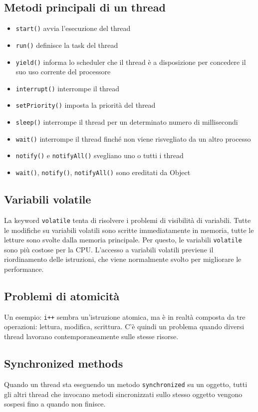 \documentclass[11pt]{article}
\newcommand{\code}[1]{\texttt{#1}}
\begin{document}
\subsection{Metodi principali di un thread}
\begin{itemize}
    \item \code{start()} avvia l'esecuzione del thread
    \item \code{run()} definisce la task del thread 
    \item \code{yield()} informa lo scheduler che il thread è a disposizione per concedere il suo uso corrente del processore
    \item \code{interrupt()} interrompe il thread 
    \item \code{setPriority()} imposta la priorità del thread 
    \item \code{sleep()} interrompe il thread per un determinato numero di millisecondi
    \item \code{wait()} interrompe il thread finché non viene risvegliato da un altro processo
    \item \code{notify()} e \code{notifyAll()} svegliano uno o tutti i thread 
    \item \code{wait()}, \code{notify()}, \code{notifyAll()} sono ereditati da Object 
\end{itemize}
\subsection{Variabili volatile}
La keyword \code{volatile} tenta di risolvere i problemi di visibilità di variabili. Tutte le modifiche su variabili volatili sono scritte immediatamente in memoria, tutte le letture sono svolte dalla memoria principale. Per questo, le variabili \code{volatile} sono più costose per la CPU. L'accesso a variabili volatili previene il riordinamento delle istruzioni, che viene normalmente svolto per migliorare le performance. 
\subsection{Problemi di atomicità}
Un esempio: \code{i++} sembra un'istruzione atomica, ma è in realtà composta da tre operazioni: lettura, modifica, scrittura. C'è quindi un problema quando diversi thread lavorano contemporaneamente sulle stesse risorse. 
\subsection{Synchronized methods}
Quando un thread sta eseguendo un metodo \code{synchronized} su un oggetto, tutti gli altri thread che invocano metodi sincronizzati sullo stesso oggetto vengono sospesi fino a quando non finisce. 
\end{document}

